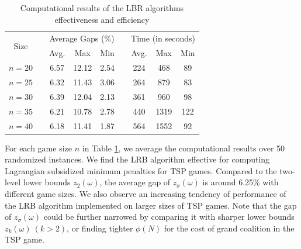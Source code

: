 \documentclass[authoryear,review,12pt]{elsarticle}
\begin{document}
\begin{table}[H]
\centering
\tabcolsep=17pt
\renewcommand\arraystretch{1.0}
\caption{\label{table:detailed20}Computational results of the LBR algorithms effectiveness and efficiency}
\begin{tabular}[!h]{c c c c c c c c c}
\hline
\multirow{2}{*}{Size}  &\multicolumn{1}{c}{} &\multicolumn{3}{c}{Average Gaps (\%)}	&\multicolumn{1}{c}{} & \multicolumn{3}{c}{Time (in seconds)}\\
\cline{3-5}
\cline{7-9}
&	&Avg.	&Max	&Min	&	&Avg.	&Max	&Min\\
\hline
$n=20$	&	&6.57	&12.12	&2.54	&	&224	&468	&89\\

$n=25$	&	&6.32	&11.43	&3.06	&	&264	&879	&83\\

$n=30$	&	&6.39	&12.04	&2.13	&	&361	&960	&98\\

$n=35$	&	&6.21	&10.78	&2.78	&	&440	&1319	&122\\

$n=40$	&	&6.18	&11.41	&1.87	&	&564	&1552	&92\\
\hline
\end{tabular}
\end{table}
For each game size $n$ in Table \ref{table:detailed20}, we average the computational results over 50 randomized instances.
We find the LRB algorithm effective for computing Lagrangian subsidized minimum penalties for TSP games.
Compared to the two-level lower bounds $z_2(\omega)$, the average gap of $z_{\sigma}(\omega)$ is around 6.25\% with different game sizes.
We also observe an increasing tendency of performance of the LRB algorithm implemented on larger sizes of TSP games.
Note that the gap of $z_{\sigma}(\omega)$ could be further narrowed by comparing it with sharper lower bounds $z_k(\omega)~(k >2)$, or finding tighter $\phi(N)$ for the cost of grand coalition in the TSP game.
\end{document}
